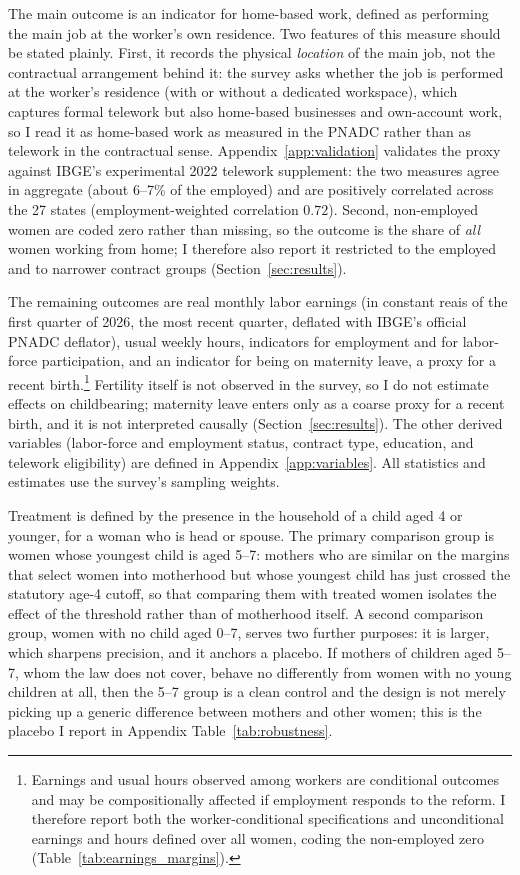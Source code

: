 \documentclass[12pt]{article}
\begin{document}
The main outcome is an indicator for home-based work, defined as performing the main job at the worker's own residence. Two features of this measure should be stated plainly. First, it records the physical \emph{location} of the main job, not the contractual arrangement behind it: the survey asks whether the job is performed at the worker's residence (with or without a dedicated workspace), which captures formal telework but also home-based businesses and own-account work, so I read it as home-based work as measured in the PNADC rather than as telework in the contractual sense. Appendix~\ref{app:validation} validates the proxy against IBGE's experimental 2022 telework supplement: the two measures agree in aggregate (about 6--7\% of the employed) and are positively correlated across the 27 states (employment-weighted correlation $0.72$). Second, non-employed women are coded zero rather than missing, so the outcome is the share of \emph{all} women working from home; I therefore also report it restricted to the employed and to narrower contract groups (Section~\ref{sec:results}).

The remaining outcomes are real monthly labor earnings (in constant reais of the first quarter of 2026, the most recent quarter, deflated with IBGE's official PNADC deflator), usual weekly hours, indicators for employment and for labor-force participation, and an indicator for being on maternity leave, a proxy for a recent birth.\footnote{Earnings and usual hours observed among workers are conditional outcomes and may be compositionally affected if employment responds to the reform. I therefore report both the worker-conditional specifications and unconditional earnings and hours defined over all women, coding the non-employed zero (Table~\ref{tab:earnings_margins}).} Fertility itself is not observed in the survey, so I do not estimate effects on childbearing; maternity leave enters only as a coarse proxy for a recent birth, and it is not interpreted causally (Section~\ref{sec:results}). The other derived variables (labor-force and employment status, contract type, education, and telework eligibility) are defined in Appendix~\ref{app:variables}. All statistics and estimates use the survey's sampling weights.

Treatment is defined by the presence in the household of a child aged 4 or younger, for a woman who is head or spouse. The primary comparison group is women whose youngest child is aged 5--7: mothers who are similar on the margins that select women into motherhood but whose youngest child has just crossed the statutory age-4 cutoff, so that comparing them with treated women isolates the effect of the threshold rather than of motherhood itself. A second comparison group, women with no child aged 0--7, serves two further purposes: it is larger, which sharpens precision, and it anchors a placebo. If mothers of children aged 5--7, whom the law does not cover, behave no differently from women with no young children at all, then the 5--7 group is a clean control and the design is not merely picking up a generic difference between mothers and other women; this is the placebo I report in Appendix Table~\ref{tab:robustness}.
\end{document}
